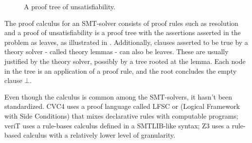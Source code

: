 \documentclass{article}
\begin{document}
	\begin{figure}[t]
		\caption{A proof tree of unsatisfiability.}
		\label{fig:tree}
	\end{figure}

	The proof calculus for an SMT-solver consists 
	of proof rules such as resolution and a 
	proof of unsatisfiability is a proof tree with 
	the assertions asserted in the problem as 
	leaves, as illustrated in .
	Additionally, clauses asserted to 
	be true by a theory solver - called theory lemmas 
	- can also be leaves. These are usually 
	justified by the theory solver, possibly by 
	a tree rooted at the lemma. Each node in 
	the tree is an application of a proof rule, 
	and the root concludes the empty clause $\bot$.
	
	Even though the calculus is common among the SMT-solvers, 
	it hasn't been standardized. CVC4 uses a proof language 
	called LFSC or (Logical Framework with Side Conditions) 
	that mixes declarative rules with computable programs; 
	veriT uses a rule-bases calculus defined in a 
	SMTLIB-like syntax; Z3 uses a rule-based calculus with 
	a relatively lower level of granularity.
	
\end{document}

